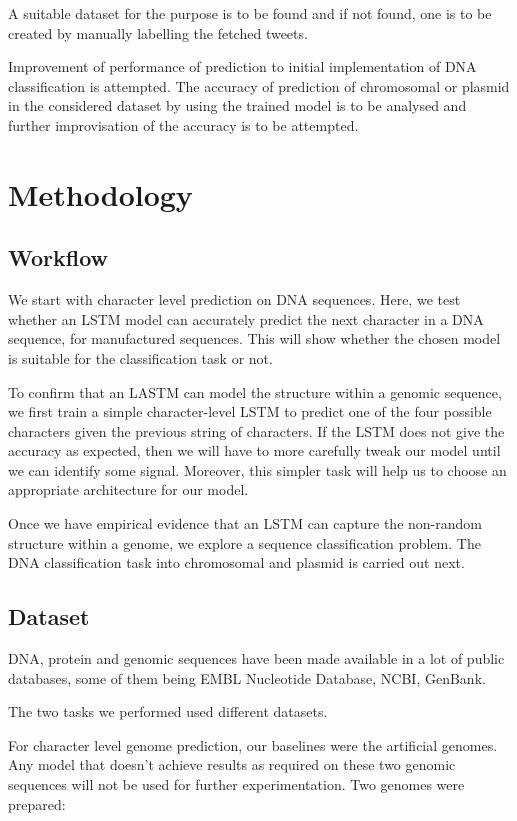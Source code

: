 \documentclass[conference]{IEEEtran}
\begin{document}
A suitable dataset for the purpose is to be found and if not found, one is to be created by manually labelling the fetched tweets.

Improvement of performance of prediction to initial implementation of DNA classification is attempted. The accuracy of prediction of chromosomal or plasmid in the considered dataset by using the trained model is to be analysed and further improvisation of the accuracy is to be attempted.


\section{Methodology}   

\subsection{Workflow}
We start with character level prediction on DNA sequences. Here, we test whether an LSTM model can accurately predict the next character in a DNA sequence, for manufactured sequences. This will show whether the chosen model is suitable for the classification task or not.

To confirm that an LASTM can model the structure within a genomic sequence, we first train a simple character-level LSTM to predict one of the four possible characters given the previous string of characters. If the LSTM does not give the accuracy as expected, then we will have to more carefully tweak our model until we can identify some signal. Moreover, this simpler task will help us to choose an appropriate architecture for our model.  

Once we have empirical evidence that an LSTM can capture the non-random structure within a genome, we explore a sequence classification problem. The DNA classification task into chromosomal and plasmid is carried out next.

\subsection{Dataset}
DNA, protein and genomic sequences have been made available in a lot of public databases, some of them being EMBL Nucleotide Database, NCBI, GenBank.

The two tasks we performed used different datasets.

For character level genome prediction, our baselines were the artificial genomes. Any model that doesn’t achieve results as required on these two genomic sequences will not be used for further experimentation.
Two genomes were prepared:
\end{document}
